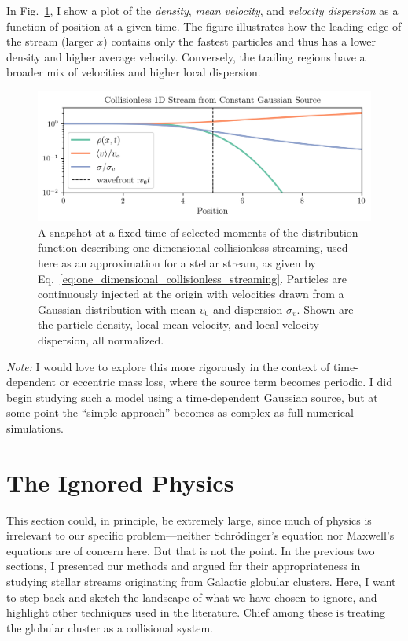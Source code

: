             In Fig.~\ref{fig:collisionless_1D_stream}, I show a plot of the \textit{density}, \textit{mean velocity}, and \textit{velocity dispersion} as a function of position at a given time. The figure illustrates how the leading edge of the stream (larger \( x \)) contains only the fastest particles and thus has a lower density and higher average velocity. Conversely, the trailing regions have a broader mix of velocities and higher local dispersion.
            \begin{figure}
                \centering
                \includegraphics[width=\linewidth]{images/collisionless_1D_stream.png}
                \caption{A snapshot at a fixed time of selected moments of the distribution function describing one-dimensional collisionless streaming, used here as an approximation for a stellar stream, as given by Eq.~\ref{eq:one_dimensional_collisionless_streaming}. Particles are continuously injected at the origin with velocities drawn from a Gaussian distribution with mean $v_0 $ and dispersion $ \sigma_v$. Shown are the particle density, local mean velocity, and local velocity dispersion, all normalized. }
                \label{fig:collisionless_1D_stream}
            \end{figure}
            \textit{Note:} I would love to explore this more rigorously in the context of time-dependent or eccentric mass loss, where the source term becomes periodic. I did begin studying such a model using a time-dependent Gaussian source, but at some point the ``simple approach'' becomes as complex as full numerical simulations. 

\section{The Ignored Physics} \label{sec:ignoredphysics}
    This section could, in principle, be extremely large, since much of physics is irrelevant to our specific problem—neither Schrödinger's equation nor Maxwell's equations are of concern here. But that is not the point. In the previous two sections, I presented our methods and argued for their appropriateness in studying stellar streams originating from Galactic globular clusters. Here, I want to step back and sketch the landscape of what we have chosen to ignore, and highlight other techniques used in the literature. Chief among these is treating the globular cluster as a collisional system.

